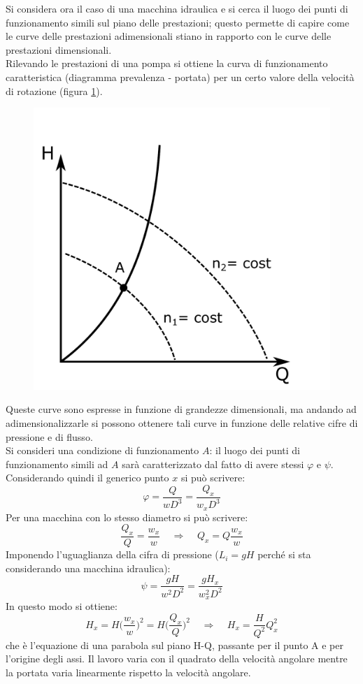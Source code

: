 Si considera ora il caso di una macchina idraulica e si cerca il luogo dei punti di funzionamento simili sul piano delle prestazioni; questo permette di capire come le curve delle prestazioni adimensionali stiano in rapporto con le curve delle prestazioni dimensionali.\\
Rilevando le prestazioni di una pompa si ottiene la curva di funzionamento caratteristica (diagramma prevalenza - portata) per un certo valore della velocità di rotazione (figura \ref{fig:hq}).
\begin{figure}[h!]
\centering
  \includegraphics[width=.3\textwidth]{fig/hq.pdf}
\caption{}
\label{fig:hq}
\end{figure}
Queste curve sono espresse in funzione di grandezze dimensionali, ma andando ad adimensionalizzarle si possono ottenere tali curve in funzione delle relative cifre di pressione e di flusso.\\
Si consideri una condizione di funzionamento $A$: il luogo dei punti di funzionamento simili ad $A$ sarà caratterizzato dal fatto di avere stessi $\varphi$ e $\psi$. Considerando quindi il generico punto $x$ si può scrivere:
\begin{equation}
\varphi = \frac{Q}{w D^3}= \frac{Q_x}{w_x D^3}
\end{equation}
Per una macchina con lo stesso diametro si può scrivere:
\begin{equation}
\frac{Q_x}{Q}=\frac{w_x}{w} \;\;\;\; \Rightarrow \;\;\;\; Q_x = Q \frac{w_x}{w}
\end{equation}
Imponendo l'uguaglianza della cifra di pressione ($L_i=gH$ perché si sta considerando una macchina idraulica):
\begin{equation}
\psi = \frac{gH}{w^2 D^2}= \frac{gH_x}{w_x^2 D^2}
\end{equation}
In questo modo si ottiene:
\begin{equation}
H_x = H\bigg(\frac{w_x}{w}\bigg)^2 = H\bigg(\frac{Q_x}{Q}\bigg)^2 \;\;\;\; \Rightarrow \;\;\;\; H_x = \frac{H}{Q^2}Q_x^2
\end{equation}
che è l'equazione di una parabola sul piano H-Q, passante per il punto A e per l'origine degli assi. Il lavoro varia con il quadrato della velocità angolare mentre la portata varia linearmente rispetto la velocità angolare.

